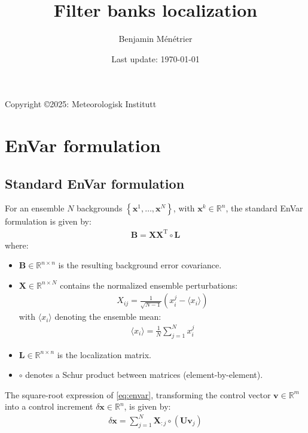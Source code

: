 \documentclass[12pt]{scrartcl}
\begin{document}
\title{Filter banks localization}
\author{Benjamin Ménétrier}
\date{Last update: \today}

\thispagestyle{empty}

\maketitle
\begin{center}
Copyright \copyright 2025: Meteorologisk Institutt
\end{center}

\tableofcontents

\section{EnVar formulation}

\subsection{Standard EnVar formulation}
For an ensemble $N$ backgrounds $\left\{\mathbf{x}^1,\dots,\mathbf{x}^N\right\}$, with $\mathbf{x}^k \in \mathbb{R}^n$, the standard EnVar formulation is given by:
\begin{align}
\label{eq:envar}
\mathbf{B} = \mathbf{X}\mathbf{X}^\mathrm{T} \circ \mathbf{L}
\end{align}
where:
\begin{itemize}
\item $\mathbf{B} \in \mathbb{R}^{n \times n}$ is the resulting background error covariance.
\item $\mathbf{X} \in \mathbb{R}^{n \times N}$ contains the normalized ensemble perturbations:
\begin{align}
X_{ij} = \frac{1}{\sqrt{N-1}} \left(x^j_i - \langle x_i \rangle\right)
\end{align}
with $\langle x_i \rangle$ denoting the ensemble mean:
\begin{align}
\langle x_i \rangle = \frac{1}{N} \sum_{j=1}^N x^j_i
\end{align}
\item $\mathbf{L} \in \mathbb{R}^{n \times n}$ is the localization matrix.
\item $\circ$ denotes a Schur product between matrices (element-by-element).
\end{itemize}
The square-root expression of \eqref{eq:envar}, transforming the control vector $\mathbf{v} \in \mathbb{R}^m$ into a control increment $\delta \mathbf{x} \in \mathbb{R}^n$, is given by:
\begin{align}
\delta \mathbf{x} = \sum_{j=1}^N \mathbf{X}_{:j} \circ \left(\mathbf{U} \mathbf{v}_j\right)
\end{align}
\end{document}
